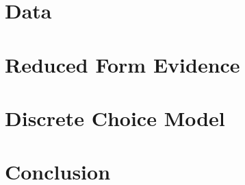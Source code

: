 \documentclass[12pt]{article}
\begin{document}
    \section{Data}

    

	
	
    \section{Reduced Form Evidence}






    \section{Discrete Choice Model}





    \section{Conclusion}
	
	
	
\end{document}
